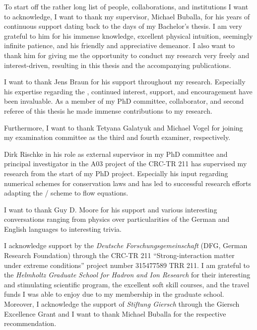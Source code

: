 To start off the rather long list of people, collaborations, and institutions I want to acknowledge, I want to thank my supervisor, Michael Buballa, for his years of continuous support dating back to the days of my Bachelor’s thesis.
I am very grateful to him for his immense knowledge, excellent physical intuition, seemingly infinite patience, and his friendly and appreciative demeanor. %
I also want to thank him for giving me the opportunity to conduct my research very freely and interest-driven, resulting in this thesis and the accompanying publications.

I want to thank Jens Braun for his support throughout my research.
Especially his expertise regarding the \grg{}, continued interest, support, and encouragement have been invaluable.
As a member of my PhD committee, collaborator, and second referee of this thesis he made immense contributions to my research.

Furthermore, I want to thank Tetyana Galatyuk and Michael Vogel for joining my examination committee as the third and fourth examiner, respectively.

Dirk Rischke in his role as external supervisor in my PhD committee and principal investigator in the A03 project of the CRC-TR 211 has supervised my research from the start of my PhD project.
Especially his input regarding numerical schemes for conservation laws and \cfd{} has led to successful research efforts adapting the \kt{}/\muscl{} scheme to \frg{} flow equations.

I want to thank Guy D. Moore for his support and various interesting conversations ranging from physics over particularities of the German and English languages to interesting trivia.\bigskip

I acknowledge support by the \textit{Deutsche Forschungsgemeinschaft} (DFG, German Research Foundation) through the CRC-TR 211 ``Strong-interaction matter under extreme conditions'' \dash{} project number 315477589 \dash{} TRR 211.
I am grateful to the \textit{Helmholtz Graduate School for Hadron and Ion Research} for their interesting and stimulating scientific program, the excellent soft skill courses, and the travel funds I was able to enjoy due to my membership in the graduate school.
Moreover, I acknowledge the support of \textit{Stiftung Giersch} through the Giersch Excellence Grant and I want to thank Michael Buballa for the respective recommendation.\bigskip

